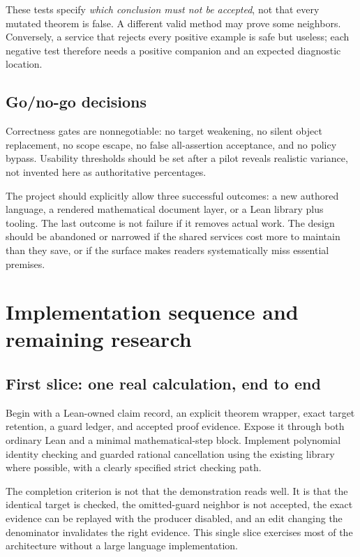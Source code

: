 \documentclass[11pt,a4paper]{article}
\theoremstyle{remark}\newtheorem{example}[proposition]{Example}
\begin{document}
These tests specify \emph{which conclusion must not be accepted}, not that every mutated theorem is false. A different valid method may prove some neighbors. Conversely, a service that rejects every positive example is safe but useless; each negative test therefore needs a positive companion and an expected diagnostic location.

\subsection{Go/no-go decisions}
Correctness gates are nonnegotiable: no target weakening, no silent object replacement, no scope escape, no false all-assertion acceptance, and no policy bypass. Usability thresholds should be set after a pilot reveals realistic variance, not invented here as authoritative percentages.

The project should explicitly allow three successful outcomes: a new authored language, a rendered mathematical document layer, or a Lean library plus tooling. The last outcome is not failure if it removes actual work. The design should be abandoned or narrowed if the shared services cost more to maintain than they save, or if the surface makes readers systematically miss essential premises.

\section{Implementation sequence and remaining research}\label{sec:roadmap}
\subsection{First slice: one real calculation, end to end}
Begin with a Lean-owned claim record, an explicit theorem wrapper, exact target retention, a guard ledger, and accepted proof evidence. Expose it through both ordinary Lean and a minimal mathematical-step block. Implement polynomial identity checking and guarded rational cancellation using the existing library where possible, with a clearly specified strict checking path.

The completion criterion is not that the demonstration reads well. It is that the identical target is checked, the omitted-guard neighbor is not accepted, the exact evidence can be replayed with the producer disabled, and an edit changing the denominator invalidates the right evidence. This single slice exercises most of the architecture without a large language implementation.
\end{document}
